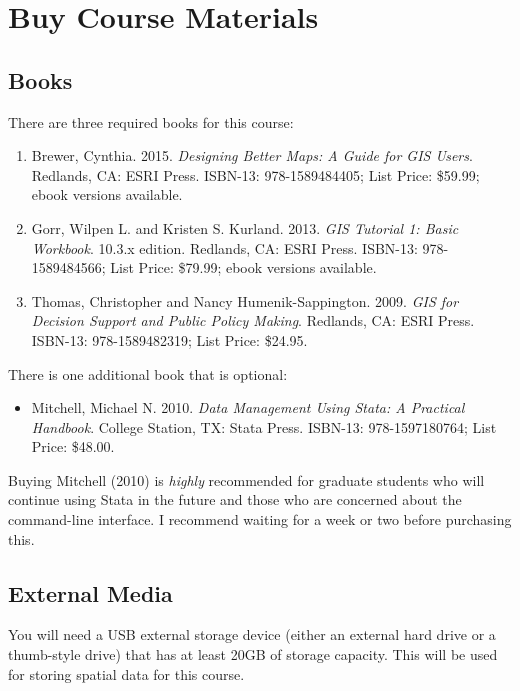 \documentclass[]{book}
\providecommand{\tightlist}{%
  \setlength{\itemsep}{0pt}\setlength{\parskip}{0pt}}
\begin{document}
\section{Buy Course Materials}\label{buy-course-materials}

\subsection*{Books}\label{books}

There are three required books for this course:

\begin{enumerate}
\def\labelenumi{\arabic{enumi}.}
\tightlist
\item
  Brewer, Cynthia. 2015. \emph{Designing Better Maps: A Guide for GIS
  Users}. Redlands, CA: ESRI Press. ISBN-13: 978-1589484405; List Price:
  \$59.99; ebook versions available.
\item
  Gorr, Wilpen L. and Kristen S. Kurland. 2013. \emph{GIS Tutorial 1:
  Basic Workbook}. 10.3.x edition. Redlands, CA: ESRI Press. ISBN-13:
  978-1589484566; List Price: \$79.99; ebook versions available.
\item
  Thomas, Christopher and Nancy Humenik-Sappington. 2009. \emph{GIS for
  Decision Support and Public Policy Making}. Redlands, CA: ESRI Press.
  ISBN-13: 978-1589482319; List Price: \$24.95.
\end{enumerate}

There is one additional book that is optional:

\begin{itemize}
\tightlist
\item
  Mitchell, Michael N. 2010. \emph{Data Management Using Stata: A
  Practical Handbook}. College Station, TX: Stata Press. ISBN-13:
  978-1597180764; List Price: \$48.00.
\end{itemize}

Buying Mitchell (2010) is \emph{highly} recommended for graduate
students who will continue using Stata in the future and those who are
concerned about the command-line interface. I recommend waiting for a
week or two before purchasing this.

\subsection*{External Media}\label{external-media}

You will need a USB external storage device (either an external hard
drive or a thumb-style drive) that has at least 20GB of storage
capacity. This will be used for storing spatial data for this course.
\end{document}
